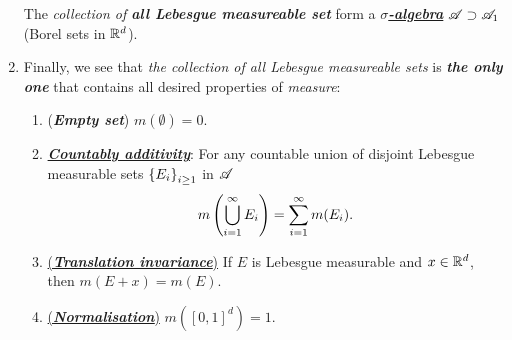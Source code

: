 \documentclass[11pt]{article}
\begin{document}
\begin{enumerate}
The \emph{collection of \textbf{all Lebesgue measureable set}} form a \underline{\emph{\textbf{$\sigma$-algebra}}} ${\mathscr A}\supset {\mathscr A}_{1}$ (Borel sets in ${\mathbb R}^{d}$).


\item Finally, we see that \emph{the collection of all Lebesgue measureable sets} is \emph{\textbf{the only one}} that contains all desired properties of \emph{measure}:
 \begin{enumerate}
\item (\textbf{\emph{Empty set}})  $m(\emptyset) = 0$.
\item \underline{\textbf{\emph{Countably additivity}}}:  For any countable union of disjoint Lebesgue measurable sets $\left\{E_{i}\right\}_{i\ge 1}$ in ${\mathscr A}$ 
\begin{align*}
 m\left(\bigcup_{i=1}^{\infty}E_{i}\right) =  \sum_{i=1}^{\infty}m(E_{i}).
\end{align*}
\item \underline{(\textbf{\emph{Translation invariance}})} If $E$ is Lebesgue measurable and $x \in {\mathbb R}^d$, then $m(E + x) = m(E)$.
\item \underline{(\textbf{\emph{Normalisation}})}  $m([0, 1]^d) = 1$.
\end{enumerate}
\end{enumerate}
\newpage
\end{document}
